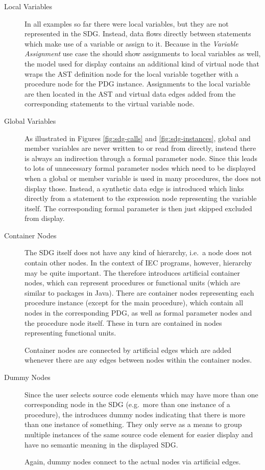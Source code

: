 \begin{description}
  \item[Local Variables] In all examples so far there were local variables, but they are not represented in the SDG. 
  Instead, data flows directly between statements which make use of a variable or assign to it. Because in the 
  \emph{Variable Assignment} use case the \SB should show assignments to local variables as well, the model used for 
  display contains an additional kind of virtual node that wraps the AST definition node for the local variable 
  together with a procedure node for the PDG instance. Assignments to the local variable are then located in the AST 
  and virtual data edges added from the corresponding statements to the virtual variable node.

  \item[Global Variables] As illustrated in Figures \ref{fig:sdg-calls} and \ref{fig:sdg-instances}, global and member 
  variables are never written to or read from directly, instead there is always an indirection through a formal 
  parameter node. Since this leads to lots of unnecessary formal parameter nodes which need to be displayed when a 
  global or member variable is used in many procedures, the \SB does not display those. Instead, a synthetic data edge 
  is introduced which links directly from a statement to the expression node representing the variable itself. The 
  corresponding formal parameter is then just skipped excluded from display.
  
  \item[Container Nodes] The SDG itself does not have any kind of hierarchy, i.e.\ a node does not contain other nodes. 
  In the context of IEC programs, however, hierarchy may be quite important. The \SB therefore introduces artificial 
  container nodes, which can represent procedures or functional units (which are similar to packages in Java). There 
  are container nodes representing each procedure instance (except for the main procedure), which contain all nodes in 
  the corresponding PDG, as well as formal parameter nodes and the procedure node itself. These in turn are contained 
  in nodes representing functional units.
  
  Container nodes are connected by artificial edges which are added whenever there are any edges between nodes within 
  the container nodes.
  
  \item[Dummy Nodes] Since the user selects source code elements which may have more than one corresponding node in the 
  SDG (e.g.\ more than one instance of a procedure), the \SB introduces dummy nodes indicating that there is more   
  than one instance of something. They only serve as a means to group multiple instances of the same source code   
  element for easier display and have no semantic meaning in the displayed SDG.
  
  Again, dummy nodes connect to the actual nodes via artificial edges.
\end{description}
